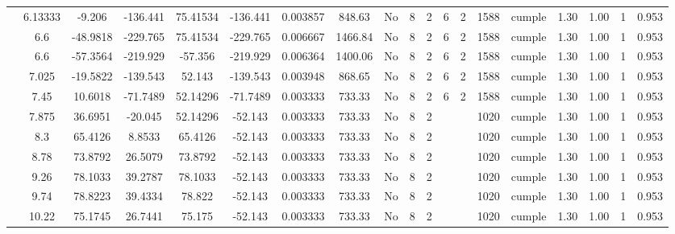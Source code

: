 \begin{table}[H]
{\begin{tabular}{|c|c|c|c|c|c|r|c|c|c|c|c|c|c|c|c|c|c|c|}
\cline{2-19}    & 6.13333 & -9.206 & -136.441 & 75.41534 & -136.441 & 0.003857 & 848.63 & No  & 8   & 2   & 6   & 2   & 1588 & \cellcolor[rgb]{ .776,  .937,  .808}cumple & 1.30 & 1.00 & 1   & 0.953 \bigstrut\\
\cline{2-19}    & \cellcolor[rgb]{ .851,  .882,  .949}6.6 & -48.9818 & -229.765 & 75.41534 & -229.765 & 0.006667 & 1466.84 & No  & 8   & 2   & 6   & 2   & 1588 & \cellcolor[rgb]{ .776,  .937,  .808}cumple & 1.30 & 1.00 & 1   & 0.953 \bigstrut\\
\cline{2-19}    & \cellcolor[rgb]{ .851,  .882,  .949}6.6 & -57.3564 & -219.929 & -57.356 & -219.929 & 0.006364 & 1400.06 & No  & 8   & 2   & 6   & 2   & 1588 & \cellcolor[rgb]{ .776,  .937,  .808}cumple & 1.30 & 1.00 & 1   & 0.953 \bigstrut\\
\cline{2-19}    & 7.025 & -19.5822 & -139.543 & 52.143 & -139.543 & 0.003948 & 868.65 & No  & 8   & 2   & 6   & 2   & 1588 & \cellcolor[rgb]{ .776,  .937,  .808}cumple & 1.30 & 1.00 & 1   & 0.953 \bigstrut\\
\cline{2-19}    & 7.45 & 10.6018 & -71.7489 & 52.14296 & -71.7489 & 0.003333 & 733.33 & No  & 8   & 2   & 6   & 2   & 1588 & \cellcolor[rgb]{ .776,  .937,  .808}cumple & 1.30 & 1.00 & 1   & 0.953 \bigstrut\\
\cline{2-19}    & 7.875 & 36.6951 & -20.045 & 52.14296 & -52.143 & 0.003333 & 733.33 & No  & 8   & 2   &     &     & 1020 & \cellcolor[rgb]{ .776,  .937,  .808}cumple & 1.30 & 1.00 & 1   & 0.953 \bigstrut\\
\cline{2-19}    & 8.3 & 65.4126 & 8.8533 & 65.4126 & -52.143 & 0.003333 & 733.33 & No  & 8   & 2   &     &     & 1020 & \cellcolor[rgb]{ .776,  .937,  .808}cumple & 1.30 & 1.00 & 1   & 0.953 \bigstrut\\
\cline{2-19}    & 8.78 & 73.8792 & 26.5079 & 73.8792 & -52.143 & 0.003333 & 733.33 & No  & 8   & 2   &     &     & 1020 & \cellcolor[rgb]{ .776,  .937,  .808}cumple & 1.30 & 1.00 & 1   & 0.953 \bigstrut\\
\cline{2-19}    & 9.26 & 78.1033 & 39.2787 & 78.1033 & -52.143 & 0.003333 & 733.33 & No  & 8   & 2   &     &     & 1020 & \cellcolor[rgb]{ .776,  .937,  .808}cumple & 1.30 & 1.00 & 1   & 0.953 \bigstrut\\
\cline{2-19}    & 9.74 & 78.8223 & 39.4334 & 78.822 & -52.143 & 0.003333 & 733.33 & No  & 8   & 2   &     &     & 1020 & \cellcolor[rgb]{ .776,  .937,  .808}cumple & 1.30 & 1.00 & 1   & 0.953 \bigstrut\\
\cline{2-19}    & 10.22 & 75.1745 & 26.7441 & 75.175 & -52.143 & 0.003333 & 733.33 & No  & 8   & 2   &     &     & 1020 & \cellcolor[rgb]{ .776,  .937,  .808}cumple & 1.30 & 1.00 & 1   & 0.953 \bigstrut\\

\end{tabular}}
\end{table}
